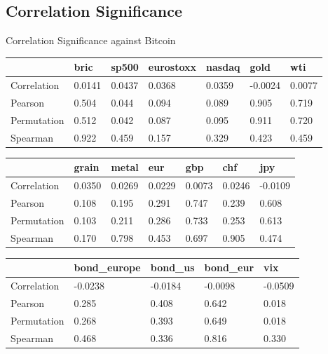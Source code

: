 \documentclass{beamer}
\newcommand\SmallerFont{\fontsize{8}{10}\selectfont}
\begin{document}
\subsection{Correlation Significance}

\begin{frame}{Correlation Significance against Bitcoin}
\SmallerFont
\begin{table}[]
\begin{tabular}{lllllll}
\toprule
 & bric & sp500 & eurostoxx & nasdaq & gold & wti \\
\midrule
Correlation & 0.0141 & 0.0437 & 0.0368 & 0.0359 & -0.0024 & 0.0077 \\
Pearson & 0.504 & 0.044 & 0.094 & 0.089 & 0.905 & 0.719 \\
Permutation & 0.512 & 0.042 & 0.087 & 0.095 & 0.911 & 0.720 \\
Spearman & 0.922 & 0.459 & 0.157 & 0.329 & 0.423 & 0.459 \\
\bottomrule
\end{tabular}

\end{table}

\begin{table}[]
\begin{tabular}{lllllll}
\toprule
 & grain & metal & eur & gbp & chf & jpy \\
\midrule
Correlation & 0.0350 & 0.0269 & 0.0229 & 0.0073 & 0.0246 & -0.0109 \\
Pearson & 0.108 & 0.195 & 0.291 & 0.747 & 0.239 & 0.608 \\
Permutation & 0.103 & 0.211 & 0.286 & 0.733 & 0.253 & 0.613 \\
Spearman & 0.170 & 0.798 & 0.453 & 0.697 & 0.905 & 0.474 \\
\bottomrule
\end{tabular}

\end{table}

\begin{table}[]
\begin{tabular}{lllll}

\toprule
 & bond\_europe & bond\_us & bond\_eur & vix \\
\midrule
Correlation & -0.0238 & -0.0184 & -0.0098 & -0.0509 \\
Pearson & 0.285 & 0.408 & 0.642 & 0.018 \\
Permutation & 0.268 & 0.393 & 0.649 & 0.018 \\
Spearman & 0.468 & 0.336 & 0.816 & 0.330 \\
\bottomrule
\end{tabular}
\end{table}

\end{frame}
\end{document}
